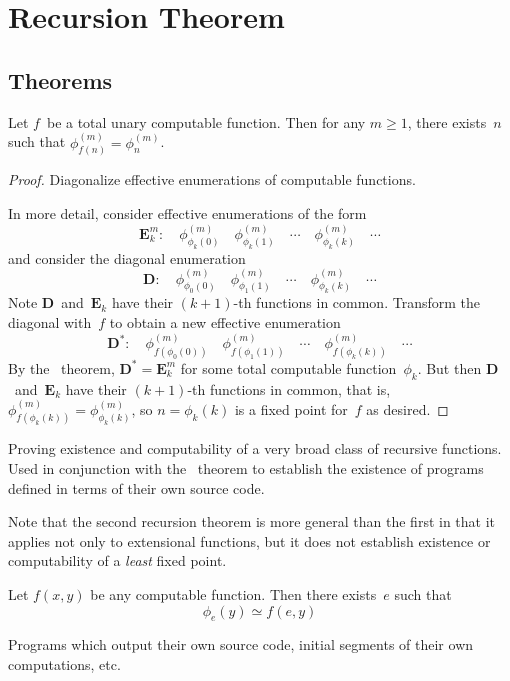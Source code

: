 %
%
%
\section{Recursion Theorem}
\subsection*{Theorems}
\begin{thm}
Let \(f\)~be a total unary computable function. Then for any \(m\ge 1\), there exists~\(n\) such that \(\phi_{f(n)}^{(m)}=\phi_n^{(m)}\).
\end{thm}
\begin{proof}
Diagonalize effective enumerations of computable functions.

In more detail, consider effective enumerations of the form
\[\mathbf{E}_k^m:\quad\phi_{\phi_k(0)}^{(m)}\quad\phi_{\phi_k(1)}^{(m)}\quad\cdots\quad\phi_{\phi_k(k)}^{(m)}\quad\cdots\]
and consider the diagonal enumeration
\[\mathbf{D}:\quad\phi_{\phi_0(0)}^{(m)}\quad\phi_{\phi_1(1)}^{(m)}\quad\cdots\quad\phi_{\phi_k(k)}^{(m)}\quad\cdots\]
Note \(\mathbf{D}\)~and~\(\mathbf{E}_k\) have their \((k+1)\)-th functions in common. Transform the diagonal with~\(f\) to obtain a new effective enumeration
\[\mathbf{D}^*:\quad\phi_{f(\phi_0(0))}^{(m)}\quad\phi_{f(\phi_1(1))}^{(m)}\quad\cdots\quad\phi_{f(\phi_k(k))}^{(m)}\quad\cdots\]
By the \smn\ theorem, \(\mathbf{D}^*=\mathbf{E}_k^m\) for some total computable function~\(\phi_k\). But then \(\mathbf{D}\)~and~\(\mathbf{E}_k\) have their \((k+1)\)-th functions in common, that is, \(\phi_{f(\phi_k(k))}^{(m)}=\phi_{\phi_k(k)}^{(m)}\), so \(n=\phi_k(k)\) is a fixed point for~\(f\) as desired.
\end{proof}
\begin{app}
Proving existence and computability of a very broad class of recursive functions. Used in conjunction with the \smn\ theorem to establish the existence of programs defined in terms of their own source code.
\end{app}
\begin{rmk}
Note that the second recursion theorem is more general than the first in that it applies not only to extensional functions, but it does not establish existence or computability of a \emph{least} fixed point.
\end{rmk}
\begin{cor}
Let \(f(x,y)\) be any computable function. Then there exists~\(e\) such that
\[\phi_e(y)\simeq f(e,y)\]
\end{cor}
\begin{app}
Programs which output their own source code, initial segments of their own computations, etc.
\end{app}


